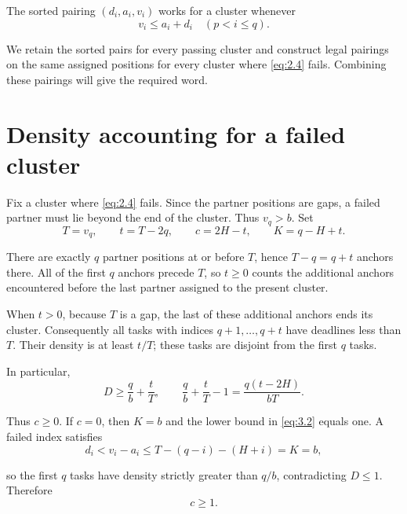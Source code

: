 \documentclass[11pt,a4paper]{article}
\begin{document}
The sorted pairing \((d_i,a_i,v_i)\) works for a cluster whenever
\begin{equation}
v_i\le a_i+d_i\quad(p<i\le q).
\tag{2.4}
\label{eq:2.4}
\end{equation}

We retain the sorted pairs for every passing cluster and construct legal pairings on the same assigned positions for every cluster where \eqref{eq:2.4} fails. Combining these pairings will give the required word.

\hypertarget{density-accounting-for-a-failed-cluster}{%
\section{Density accounting for a failed cluster}\label{density-accounting-for-a-failed-cluster}}

Fix a cluster where \eqref{eq:2.4} fails. Since the partner positions are gaps, a failed partner must lie beyond the end of the cluster. Thus \(v_q>b\). Set
\begin{equation}
T=v_q,\qquad t=T-2q,\qquad c=2H-t,\qquad K=q-H+t.
\tag{3.1}
\label{eq:3.1}
\end{equation}

There are exactly \(q\) partner positions at or before \(T\), hence \(T-q=q+t\) anchors there. All of the first \(q\) anchors precede \(T\), so \(t\ge0\) counts the additional anchors encountered before the last partner assigned to the present cluster.

When \(t>0\), because \(T\) is a gap, the last of these additional anchors ends its cluster. Consequently all tasks with indices \(q+1,\ldots,q+t\) have deadlines less than \(T\). Their density is at least \(t/T\); these tasks are disjoint from the first \(q\) tasks.

In particular,
\begin{equation}
D\ge\frac q b+\frac tT,
\qquad
\frac q b+\frac tT-1=\frac{q(t-2H)}{bT}.
\tag{3.2}
\label{eq:3.2}
\end{equation}

Thus \(c\ge0\). If \(c=0\), then \(K=b\) and the lower bound in \eqref{eq:3.2} equals one. A failed index satisfies
\begin{equation}
d_i<v_i-a_i\le T-(q-i)-(H+i)=K=b,
\tag{3.3}
\label{eq:3.3}
\end{equation}

so the first \(q\) tasks have density strictly greater than \(q/b\), contradicting \(D\le1\). Therefore
\begin{equation}
c\ge1.
\tag{3.4}
\label{eq:3.4}
\end{equation}
\end{document}
